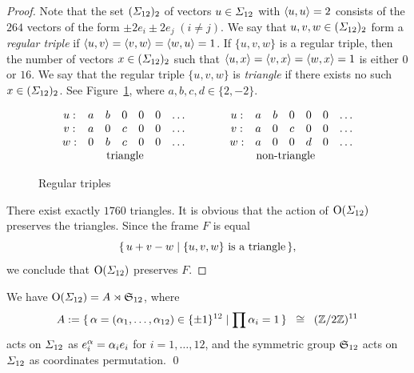 \documentclass{amsart} %
\begin{document}
\begin{proof}
Note that the set $(\varSigma_{12})_2$ of vectors $u\in \varSigma_{12}$ with $\langle u, u \rangle=2$
consists of the $264$ vectors of the form $\pm 2 e_i\pm 2 e_j\; (i\ne j)$.
We say that $u, v, w\in( \varSigma_{12})_2$ form a \emph{regular triple} if 
$\langle u, v \rangle=\langle v, w \rangle=\langle w, u \rangle=1$.
If $\{u, v, w\}$ is a regular triple, then the number of 
vectors $x\in( \varSigma_{12})_2$ such that 
$\langle u, x \rangle=\langle v, x \rangle=\langle w, x \rangle=1$
is either $0$ or $16$.
We say that the  regular triple $\{u, v, w\}$ is \emph{triangle} if there exists no  such $x\in (\varSigma_{12})_2$.
See Figure~\ref{fig:triangle},
where $a, b, c , d\in \{2, -2\}$.
%
\begin{figure}
{\small
\[
\begin{array}{ccccccc}
u: & a& b & 0 & 0 & 0 &\dots\\
v: &a&0 & c & 0 & 0 &\dots\\
w: & 0& b & c & 0 & 0 & \dots\\
&  \rlap{\textrm{\;\;\;\;\;triangle}}  &&  &
\end{array}
\qquad\quad
\begin{array}{ccccccc}
u: &a& b & 0 & 0 & 0 &\dots\\
v: &a&0 & c & 0 & 0 & \dots\\
w: &a& 0 & 0 & d & 0 & \dots\\
\rlap{ \textrm{\;\;\;\;\;non-triangle}} && &  &
\end{array}
\]
}
\vskip -1mm
\caption{Regular triples}\label{fig:triangle}
\end{figure}
%
There exist exactly $1760$  triangles.
It is obvious that the action of $\mathord{\mathrm{O}}(\varSigma_{12})$ preserves the triangles.
Since 
 the frame $F$ is equal 
\[
\{\,{u+v-w}\mid {\textrm{$\{u, v, w\}$ is a triangle}} \,\},
\]
we conclude that  $\mathord{\mathrm{O}}(\varSigma_{12})$ preserves $F$.
\end{proof}
%
\begin{corollary}\label{cor:OGSigma}
We have $\mathord{\mathrm{O}}(\varSigma_{12})=A\rtimes\mathord{\mathfrak{S}}_{12}$,
where
\[
A:=\{\,{\alpha=(\alpha_1, \dots, \alpha_{12})\in \{\pm 1\}^{12}}\mid {\prod\alpha_i=1} \,\}\;\; \cong\;\; (\mathord{\mathbb{Z}}/2\mathord{\mathbb{Z}})^{11}
\]
acts on $\varSigma_{12}$   as $e_i\sp{\alpha}=\alpha_i e_i$ for $i=1, \dots, 12$, 
and
the symmetric group $\mathord{\mathfrak{S}}_{12}$ 
acts  on $\varSigma_{12}$  as coordinates permutation.
\qed
\end{corollary}
\end{document}
